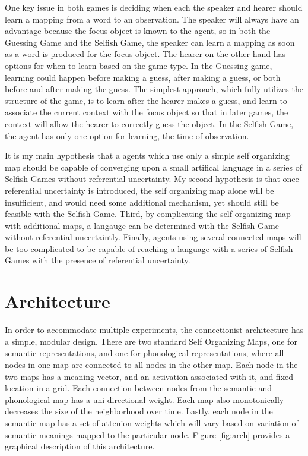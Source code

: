 \documentclass[a4paper,11pt]{article}
\begin{document}
One key issue in both games is deciding when each the speaker and hearer should
learn a mapping from a word to an observation.  The speaker will always have an
advantage because the focus object is known to the agent, so in both the
Guessing Game and the Selfish Game, the speaker can learn a mapping as soon as a
word is produced for the focus object.  The hearer on the other hand has options
for when to learn based on the game type.  In the Guessing game, learning could
happen before making a guess, after making a guess, or both before and after
making the guess.  The simplest approach, which fully utilizes the structure
of the game, is to learn after the hearer makes a guess, and learn to
associate the current context with the focus object so that in later games,
the context will allow the hearer to correctly guess the object. In the
Selfish Game, the agent has only one option for learning, the time of
observation.

It is my main hypothesis that a agents which use only a simple self organizing
map should be capable of converging upon a small artifical language in a series
of Selfish Games without referential uncertainty. My second hypothesis is that
once referential uncertainty is introduced, the self organizing map alone will
be insufficient, and would need some additional mechanism, yet should still be
feasible with the Selfish Game.  Third, by complicating the self organizing map
with additional maps, a langauge can be determined with the Selfish Game without
referential uncertaintly.  Finally, agents using several connected maps will be
too complicated to be capable of reaching a language with a series of Selfish
Games with the presence of referential uncertainty.

\section{Architecture}

In order to accommodate multiple experiments, the connectionist architecture has
a simple, modular design.  There are two standard Self Organizing Maps, one for
semantic representations, and one for phonological representations, where all
nodes in one map are connected to all nodes in the other map.  Each node in
the two maps has a meaning vector, and an activation associated with it, and
fixed location in a grid.  Each
connection between nodes from the semantic and phonological map has a
uni-directional weight.  Each map also monotonically decreases the size of the
neighborhood over time.  Lastly, each node in the semantic map has a set
of attenion weights which will vary based on variation of semantic meanings
mapped to the particular node.  Figure \ref{fig:arch} provides a graphical
description of this architecture.
\end{document}
